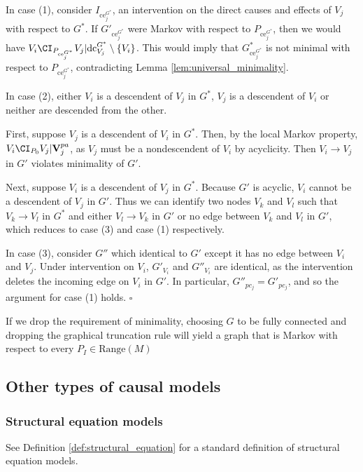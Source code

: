 In case (1), consider $I_{\mathrm{ce}_j^{G^*}}$, an intervention on the direct causes and effects of $V_j$ with respect to $G^*$.  If $G'_{\mathrm{ce}_j^{G^*}}$ were Markov with respect to $P_{\mathrm{ce}_j^{G^*}}$, then we would have $V_i \CI_{P_{{\mathrm{ce}_j^{G^*}}}} V_j | \mathrm{dc}^{G^*}_{V_j}\setminus \{V_i\}$. This would imply that $G^*_{\mathrm{ce}_j^{G^*}}$ is not minimal with respect to $P_{\mathrm{ce}_j^{G^*}}$, contradicting Lemma \ref{lem:universal_minimality}.

In case (2), either $V_i$ is a descendent of $V_j$ in $G^*$, $V_j$ is a descendent of $V_i$ or neither are descended from the other. 

First, suppose $V_j$ is a descendent of $V_i$ in $G^*$. Then, by the local Markov property, $V_i\CI_{P_0} V_j | \mathbf{V}^{pa}_j$, as $V_j$ must be a nondescendent of $V_i$ by acyclicity. Then $V_i\to V_j$ in $G'$ violates minimality of $G'$. 

Next, suppose $V_i$ is a descendent of $V_j$ in $G^*$. Because $G'$ is acyclic, $V_i$ cannot be a descendent of $V_j$ in $G'$. Thus we can identify two nodes $V_k$ and $V_l$ such that $V_k\to V_l$ in $G^*$ and either $V_l\to V_k$ in $G'$ or no edge between $V_k$ and $V_l$ in $G'$, which reduces to case (3) and case (1) respectively.

In case (3), consider $G''$ which identical to $G'$ except it has no edge between $V_i$ and $V_j$. Under intervention on $V_i$, $G'_{V_i}$ and $G''_{V_i}$ are identical, as the intervention deletes the incoming edge on $V_i$ in $G'$. In particular, $G''_{pc_j}=G'_{pc_j}$, and so the argument for case (1) holds. $\square$

 If we drop the requirement of minimality, choosing $G$ to be fully connected and dropping the graphical truncation rule will yield a graph that is Markov with respect to every $P_I\in\mathrm{Range}(M)$

\subsection*{Other types of causal models}

\subsubsection*{Structural equation models}

See Definition \ref{def:structural_equation} for a standard definition of structural equation models. 

